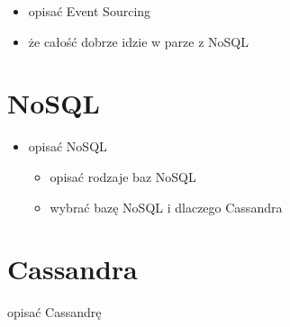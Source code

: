 \begin{itemize}
 \item opisać Event Sourcing
 \item że całość dobrze idzie w parze z NoSQL
\end{itemize}



\section{NoSQL}

\begin{itemize}
 \item opisać NoSQL
  \begin{itemize}
   \item opisać rodzaje baz NoSQL
   \item wybrać bazę NoSQL i dlaczego Cassandra
  \end{itemize}
\end{itemize}



\section{Cassandra}

opisać Cassandrę
